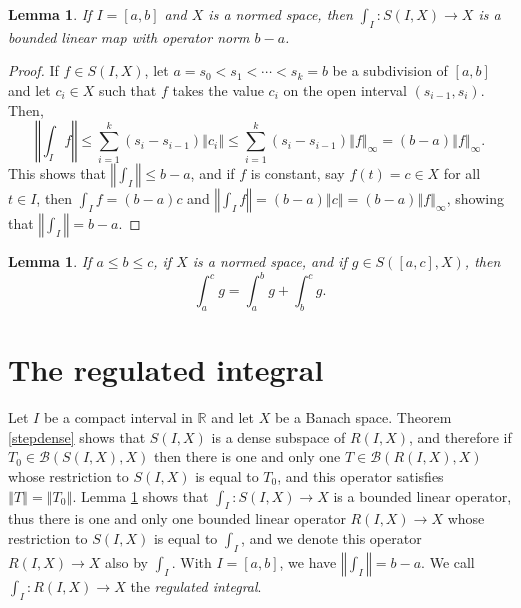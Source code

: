 \documentclass{article}
\newcommand{\norm}[1]{\left\Vert #1 \right\Vert}
\newtheorem{lemma}[theorem]{Lemma}
\theoremstyle{definition}
\begin{document}
\begin{lemma}
If $I=[a,b]$ and $X$ is a normed space, then $\int_I:S(I,X) \to X$ is a bounded linear map with operator norm $b-a$.
\label{operatornorm}
\end{lemma}
\begin{proof}
If $f \in S(I,X)$, let $a=s_0<s_1<\cdots<s_k=b$ be a subdivision of $[a,b]$ and let $c_i \in X$ such that $f$ takes the value 
$c_i$ on the open interval $(s_{i-1},s_i)$. Then,
\[
\norm{\int_I f} \leq \sum_{i=1}^k (s_i-s_{i-1}) \norm{c_i} \leq
\sum_{i=1}^k (s_i-s_{i-1}) \norm{f}_\infty 
=(b-a)\norm{f}_\infty.
\]
This shows that $\norm{\int_I} \leq b-a$, and if $f$ is constant, say $f(t)=c \in X$ for all $t \in I$, then $\int_I f = (b-a)c$ and 
$\norm{\int_I f}=(b-a)\norm{c}=(b-a)\norm{f}_\infty$, showing that $\norm{\int_I}=b-a$.
\end{proof}

\begin{lemma}
If $a \leq b \leq c$, if $X$ is a normed space, and if $g \in S([a,c],X)$, then
\[
\int_a^c g = \int_a^b g + \int_b^c g.
\]
\label{chaslesstep}
\end{lemma}



\section{The regulated integral}
Let $I$ be a compact interval in $\mathbb{R}$ and let $X$ be a Banach space.
Theorem \ref{stepdense} shows that $S(I,X)$ is a dense subspace of $R(I,X)$, and therefore
if $T_0 \in \mathscr{B}(S(I,X), X)$ then there is one and only one 
$T \in \mathscr{B}(R(I,X), X)$ whose restriction to $S(I,X)$ is equal to $T_0$, and this operator satisfies $\norm{T}=\norm{T_0}$. 
 Lemma \ref{operatornorm}
 shows that $\int_I:S(I,X) \to X$ is a bounded linear operator, thus there is one and only one bounded linear
 operator
 $R(I,X) \to X$ whose restriction to $S(I,X)$ is equal to $\int_I$, and we denote this operator $R(I,X) \to X$ also by $\int_I$. 
 With $I=[a,b]$, we have $\norm{\int_I}=b-a$. We call $\int_I:R(I,X) \to X$ the {\em regulated integral}.
 
\end{document}
